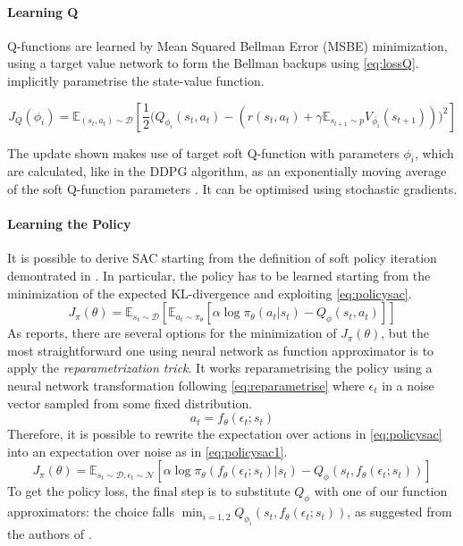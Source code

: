 \paragraph{Learning Q} Q-functions are learned by Mean Squared Bellman Error (MSBE) minimization, using a target value network to form the Bellman backups using \vref{eq:lossQ}.  implicitly parametrise the state-value function.

\begin{equation} \label{eq:lossQ}
	J_Q(\phi_i) = \mathbb{E}_{(s_t,a_t) \sim \mathcal D}\left[ \frac{1}{2}\Bigg( Q_{\phi_i}(s_t,a_t) - \left(r(s_t, a_t) + \gamma \mathbb{E}_{s_{t+1} \sim p} V_{\bar{\phi_i}}(s_{t+1}) \right) \Bigg)^2 \right]
\end{equation}


The update shown makes use of target soft Q-function with parameters $\phi_i$, which are calculated, like in the DDPG algorithm, as an exponentially moving average of the soft Q-function parameters \cite{mnih2015human}. It can be optimised using stochastic gradients.

\paragraph{Learning the Policy} It is possible to derive SAC starting from the definition of soft policy iteration demontrated in   \cite[Section 4]{haarnoja2018alg}. In particular, the policy has to be learned starting from the minimization of the expected KL-divergence \cite{kullback1959information,kullback1951information} and exploiting \vref{eq:policysac}.
\begin{equation} \label{eq:policysac}
	J_\pi(\theta) = \mathbb{E}_{s_t \sim \mathcal{D}}[\mathbb{E}_{a_t \sim \pi_\theta}[\alpha \log \pi_\theta(a_t|s_t) - Q_\phi(s_t,a_t)]]
\end{equation}
As \cite{haarnoja2018alg} reports, there are several options for the minimization of $J_\pi(\theta)$, but the most straightforward one using neural network as function approximator is to apply the \textit{reparametrization trick}.
It works reparametrising the policy using a neural network transformation following \vref{eq:reparametrise} where $\epsilon_t$ in a noise vector sampled from some fixed distribution.
\begin{equation} \label{eq:reparametrise}
	a_t = f_\theta(\epsilon_t; s_t)
\end{equation}
Therefore, it is possible to rewrite the expectation over actions in \vref{eq:policysac} into an expectation over noise as in \vref{eq:policysac1}.
\begin{equation} \label{eq:policysac1}
	J_\pi(\theta) = \mathbb{E}_{s_t \sim \mathcal{D}, \epsilon_t \sim \mathcal{N}}[\alpha \log \pi_\theta(f_\theta(\epsilon_t; s_t)|s_t) - Q_\phi(s_t,f_\theta(\epsilon_t; s_t))]
\end{equation}
To get the policy loss, the final step is to substitute $Q_{\phi}$ with one of our function approximators: the choice falls $\min_{i=1,2}Q_{\phi_i}(s_t, f_\theta(\epsilon_t; s_t))$, as suggested from the authors of \cite{haarnoja2018alg}.

